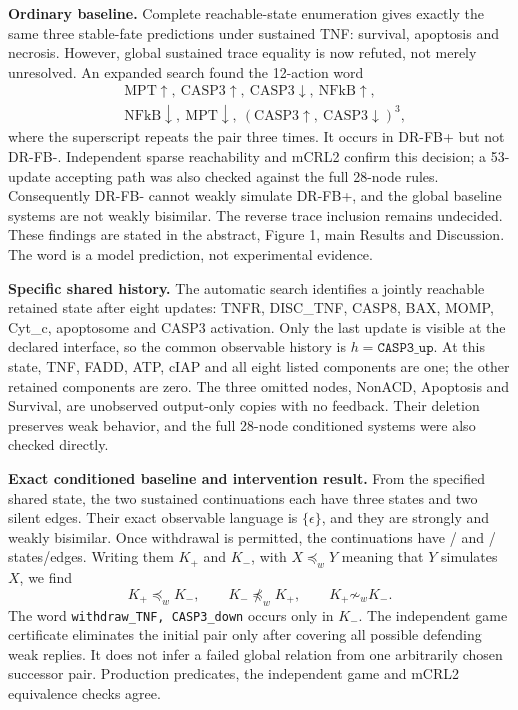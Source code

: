 \documentclass[11pt]{article}
\begin{document}
\textbf{Ordinary baseline.} Complete reachable-state enumeration gives exactly
the same three stable-fate predictions under sustained TNF: survival,
apoptosis and necrosis. However, global sustained trace equality is now
refuted, not merely unresolved. An expanded search found the 12-action word
\[
\begin{split}
&\mathrm{MPT}\!\uparrow,\ \mathrm{CASP3}\!\uparrow,\
\mathrm{CASP3}\!\downarrow,\ \mathrm{NFkB}\!\uparrow,\\
&\mathrm{NFkB}\!\downarrow,\ \mathrm{MPT}\!\downarrow,\
(\mathrm{CASP3}\!\uparrow,\ \mathrm{CASP3}\!\downarrow)^3,
\end{split}
\]
where the superscript repeats the pair three times. It occurs in DR-FB+
but not DR-FB-. Independent sparse reachability and mCRL2 confirm this
decision; a 53-update accepting path was also checked against the full
28-node rules. Consequently DR-FB- cannot weakly simulate DR-FB+, and the
global baseline systems are not weakly bisimilar. The reverse trace inclusion
remains undecided. These findings are stated in the abstract, Figure 1, main
Results and Discussion. The word is a model prediction, not experimental evidence.

\textbf{Specific shared history.} The automatic search identifies a jointly
reachable retained state after eight updates: TNFR, DISC\_TNF, CASP8, BAX,
MOMP, Cyt\_c, apoptosome and CASP3 activation. Only the last update is visible
at the declared interface, so the common observable history is
$h=\texttt{CASP3\_up}$. At this state, TNF, FADD, ATP, cIAP and all eight
listed components are one; the other retained components are zero.
The three omitted nodes, NonACD, Apoptosis and Survival, are unobserved
output-only copies with no feedback. Their deletion preserves weak behavior,
and the full 28-node conditioned systems were also checked directly.

\textbf{Exact conditioned baseline and intervention result.} From the
specified shared state, the two sustained continuations each have three
states and two silent edges. Their exact observable language is
$\{\epsilon\}$, and they are strongly and weakly bisimilar. Once withdrawal
is permitted, the continuations have \DRLocalPlusStates{}/\DRLocalPlusEdges{}
and \DRLocalMinusStates{}/\DRLocalMinusEdges{} states/edges. Writing them
$K_+$ and $K_-$, with $X\preceq_wY$ meaning that $Y$ simulates $X$, we find
\[
K_+\preceq_wK_-,\qquad K_-\not\preceq_wK_+,\qquad K_+\not\sim_wK_-.
\]
The word \texttt{withdraw\_TNF, CASP3\_down} occurs only in $K_-$. The
independent game certificate eliminates the initial pair only after covering
all possible defending weak replies. It does not infer a failed global
relation from one arbitrarily chosen successor pair. Production predicates,
the independent game and mCRL2 equivalence checks agree.
\end{document}

